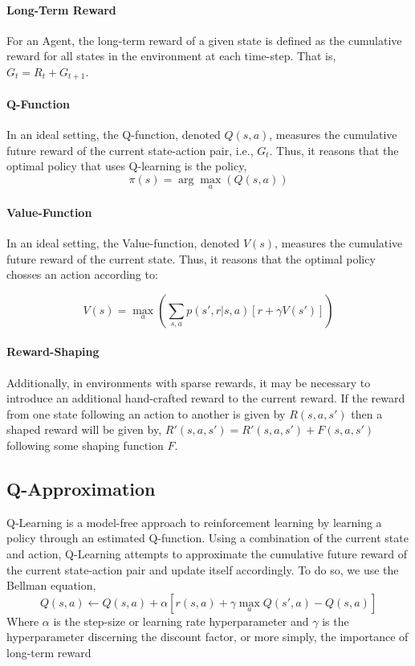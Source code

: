 \documentclass[../report.tex]{subfiles}
\begin{document}
\paragraph{Long-Term Reward}
For an Agent, the long-term reward of a given state is defined as the cumulative reward for all states in the environment at each time-step. That is, $G_t=R_t+G_{t+1}$.

\paragraph{Q-Function}
In an ideal setting, the Q-function, denoted $Q(s,a)$, measures the cumulative future reward of the current state-action pair, i.e., $G_t$. Thus, it reasons that the optimal policy that uses Q-learning is the policy,
\begin{equation}\label{eq:policy}
    \pi(s)=\arg\max\limits_{a}(Q(s,a))
\end{equation}

\paragraph{Value-Function}
In an ideal setting, the Value-function, denoted $V(s)$, measures the cumulative future reward of the current state. Thus, it reasons that the optimal policy chosses an action according to:

\begin{equation}\label{eq:value}
    V(s)=\max\limits_{a}(\sum_{s, a} p(s', r | s, a)[r + \gamma V(s')] )
\end{equation}

\paragraph{Reward-Shaping}
Additionally, in environments with sparse rewards, it may be necessary to introduce an additional hand-crafted reward to the current reward. If the reward from one state following an action to another is given by $R(s,a,s')$ then a shaped reward will be given by, $R'(s,a,s') = R'(s,a,s') + F(s,a,s')$ following some shaping function $F$.  


\subsection{Q-Approximation}\label{sec:q-approx}
Q-Learning is a model-free approach to reinforcement learning by learning a policy through an estimated Q-function. Using a combination of the current state and action, Q-Learning attempts to approximate the cumulative future reward of the current state-action pair and update itself accordingly. To do so, we use the Bellman equation,
\begin{equation}\label{eq:bellman_update}
    Q(s,a) \leftarrow Q(s,a) + \alpha [ r(s,a) + \gamma \max_a Q(s',a) - Q(s,a)]
\end{equation}
Where $\alpha$ is the step-size or learning rate hyperparameter and $\gamma$ is the hyperparameter discerning the discount factor, or more simply, the importance of long-term reward
\end{document}
